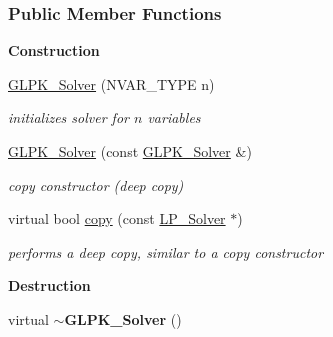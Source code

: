 \subsubsection*{Public Member Functions}
\begin{Indent}\textbf{ Construction}\par
\begin{DoxyCompactItemize}
\item 
\mbox{\label{group___c_l_s_solvers_a10b3981d1807e86315318505ae0faeba}} 
\hyperlink{group___c_l_s_solvers_a10b3981d1807e86315318505ae0faeba}{G\+L\+P\+K\+\_\+\+Solver} (N\+V\+A\+R\+\_\+\+T\+Y\+PE n)
\begin{DoxyCompactList}\small\item\em initializes solver for $ n $ variables \end{DoxyCompactList}\item 
\mbox{\label{group___c_l_s_solvers_acdba8634513aafff25e17d42e3f8261b}} 
\hyperlink{group___c_l_s_solvers_acdba8634513aafff25e17d42e3f8261b}{G\+L\+P\+K\+\_\+\+Solver} (const \hyperlink{group___c_l_s_solvers_class_l_p___solvers_1_1_g_l_p_k___solver}{G\+L\+P\+K\+\_\+\+Solver} \&)
\begin{DoxyCompactList}\small\item\em copy constructor (deep copy) \end{DoxyCompactList}\item 
virtual bool \hyperlink{group___c_l_s_solvers_aafcda320ace4a6892704b46af99ce446}{copy} (const \hyperlink{group___c_l_s_solvers_class_l_p___solvers_1_1_l_p___solver}{L\+P\+\_\+\+Solver} $\ast$)
\begin{DoxyCompactList}\small\item\em performs a deep copy, similar to a copy constructor \end{DoxyCompactList}\end{DoxyCompactItemize}
\end{Indent}
\begin{Indent}\textbf{ Destruction}\par
\begin{DoxyCompactItemize}
\item 
\mbox{\label{group___c_l_s_solvers_a5712c834300cea2063aa932ad8a817d7}} 
virtual {\bfseries $\sim$\+G\+L\+P\+K\+\_\+\+Solver} ()
\end{DoxyCompactItemize}
\end{Indent}
